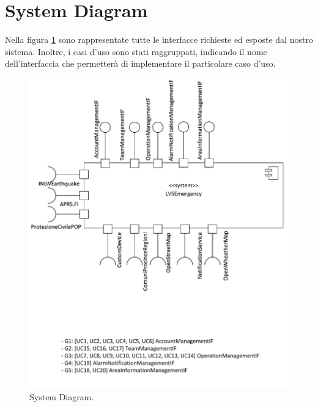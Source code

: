 \section{System Diagram}
Nella figura \ref{fig:SystemDiagram} sono rappresentate tutte le interfacce richieste ed esposte dal nostro sistema. Inoltre, i casi d'uso sono stati raggruppati, indicando il nome dell'interfaccia che permetterà di implementare il particolare caso d'uso.

\begin{figure}[h!]
	\centering
	\includegraphics[width=0.7\linewidth]{./Iterazione 1/OtherFiles/UML - System View}
	\caption{System Diagram.}
	\label{fig:SystemDiagram}
\end{figure}